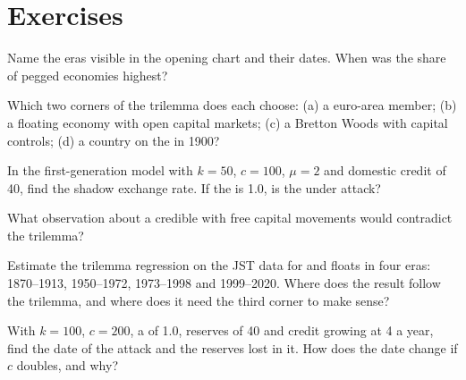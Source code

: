 \section{Exercises}\label{sec:b3:exchange-rate-regimes:exercises}

\begin{exercise}[$\star$]\label{exo:b3:exchange-rate-regimes:1}
Name the eras visible in the opening chart and their dates. When was the share of
pegged economies highest?
\end{exercise}

\begin{exercise}[$\star$]\label{exo:b3:exchange-rate-regimes:2}
Which two corners of the trilemma does each choose: (a) a euro-area member; (b) a
floating economy with open capital markets; (c) a Bretton Woods  with capital
controls; (d) a country on the  in 1900?
\end{exercise}

\begin{exercise}[$\star$]\label{exo:b3:exchange-rate-regimes:3}
In the first-generation model with $k = 50$, $c = 100$, $\mu = 2$ and domestic credit of 40,
find the shadow exchange rate. If the  is 1.0, is the  under attack?
\end{exercise}

\begin{exercise}[$\star$]\label{exo:b3:exchange-rate-regimes:4}
What observation about a credible  with free capital movements would
contradict the trilemma?
\end{exercise}

\begin{exercise}[$\star\star$]\label{exo:b3:exchange-rate-regimes:5}
Estimate the trilemma regression on the JST data for  and floats in four eras:
1870--1913, 1950--1972, 1973--1998 and 1999--2020. Where does the result follow the
trilemma, and where does it need the third corner to make sense?
\end{exercise}

\begin{exercise}[$\star\star$]\label{exo:b3:exchange-rate-regimes:6}
With $k = 100$, $c = 200$, a  of 1.0, reserves of 40 and credit growing at 4 a year,
find the date of the attack and the reserves lost in it. How does the date
change if $c$ doubles, and why?
\end{exercise}

